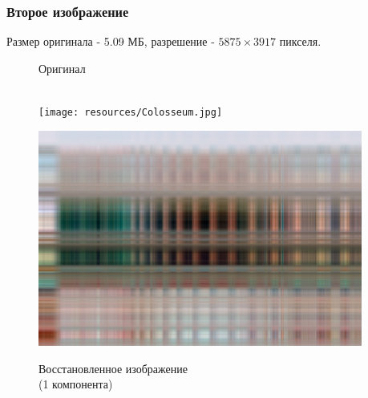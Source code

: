 \documentclass[a4paper]{article}
\begin{document}
\subsubsection{Второе изображение}
Размер оригинала - 5.09 МБ, разрешение - $5875\times 3917$ пикселя.
\begin{figure}[H]
\centering
    \begin{minipage}{.45\textwidth}
    \centering
    \caption{Оригинал\\$\,$}
    \texttt{[image: resources/Colosseum.jpg]}
    \label{fig:colos}
    \end{minipage}%
    \begin{minipage}{.45\textwidth}
      \centering
    \caption{Восстановленное изображение \\(1 компонента)}
    \includegraphics[width = 0.95\textwidth]{reconstructions/with_1comps_Colosseum.jpg}
    \label{fig:col_1}
    \end{minipage}%
\end{figure}
\end{document}
